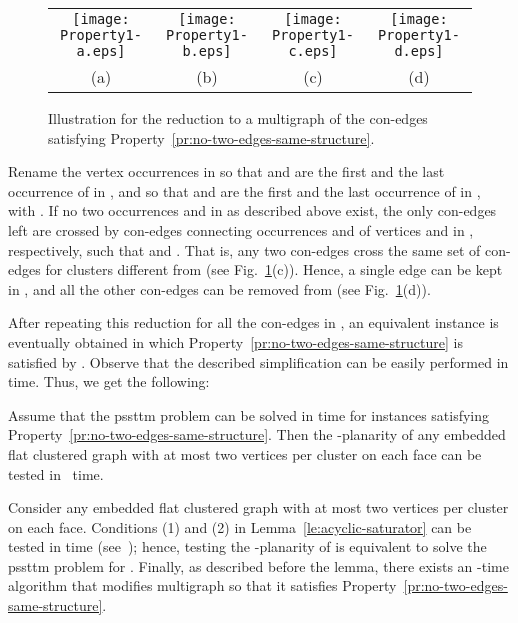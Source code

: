 \documentclass[letter,runningheads]{llncs}
\renewenvironment{proof}
{{\em Proof.\ }}{\hspace*{\fill}\par\vspace{2mm}}
\begin{document}
\begin{figure}[tb]
\begin{center}
\begin{tabular}{c c c c}
\mbox{\texttt{[image: Property1-a.eps]}} \hspace{2mm} &
\mbox{\texttt{[image: Property1-b.eps]}}  \hspace{2mm} &
\mbox{\texttt{[image: Property1-c.eps]}}  \hspace{2mm} &
\mbox{\texttt{[image: Property1-d.eps]}}\\
(a) \hspace{2mm} & (b) \hspace{2mm} & (c) \hspace{2mm} & (d)
\end{tabular}
\caption{Illustration for the reduction to a multigraph of the con-edges satisfying Property~\ref{pr:no-two-edges-same-structure}.}
\label{fig:property1}
\end{center}
\end{figure}

Rename the vertex occurrences in  so that  and  are the first and the last occurrence of  in , and so that  and  are the first and the last occurrence of  in , with . If no two occurrences  and  in  as described above exist, the only con-edges  left are crossed by con-edges connecting occurrences  and  of vertices  and  in , respectively, such that  and . That is, any two con-edges  cross the same set of con-edges for clusters different from  (see Fig.~\ref{fig:property1}(c)). Hence, a single edge  can be kept in , and all the other con-edges  can be removed from  (see Fig.~\ref{fig:property1}(d)).

After repeating this reduction for all the con-edges in , an equivalent instance is eventually obtained in which Property~\ref{pr:no-two-edges-same-structure} is satisfied by . Observe that the described simplification can be easily performed in  time. Thus, we get the following:

\begin{lemma} \label{le:pssttm}
Assume that the {\sc pssttm} problem can be solved in  time for instances satisfying Property~\ref{pr:no-two-edges-same-structure}. Then the -planarity of any embedded flat clustered graph  with at most two vertices per cluster on each face can be tested in ~time.
\end{lemma}

\begin{proof}
Consider any embedded flat clustered graph  with at most two vertices per cluster on each face. Conditions (1) and (2) in Lemma~\ref{le:acyclic-saturator} can be tested in  time (see~\cite{df-ectefcgsf-09}); hence, testing the -planarity of  is equivalent to solve the {\sc pssttm} problem for . Finally, as described before the lemma, there exists an -time algorithm that modifies multigraph  so that it satisfies Property~\ref{pr:no-two-edges-same-structure}.
\end{proof}
\end{document}
